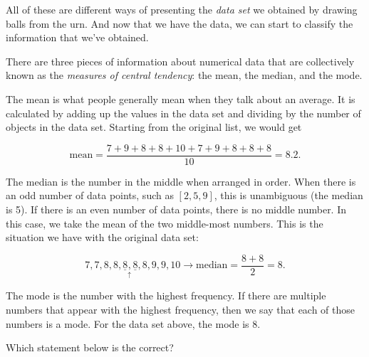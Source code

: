 \documentclass{ximera}
\begin{document}
\begin{image}
\end{image}

All of these are different ways of presenting the \emph{data set} we obtained by drawing balls from the urn. And now that we have the data, we can start to classify the information that we've obtained.

There are three pieces of information about numerical data that are collectively known as the \emph{measures of central tendency}: the mean, the median, and the mode.

The mean is what people generally mean when they talk about an average. It is calculated by adding up the values in the data set and dividing by the number of objects in the data set. Starting from the original list, we would get

\[ \text{mean} = \dfrac{7 + 9 + 8 + 8 + 10 + 7 + 9 + 8 + 8 + 8}{10} = 8.2. \]

The median is the number in the middle when arranged in order. When there is an odd number of data points, such as $[2, 5, 9]$, this is unambiguous (the median is 5). If there is an even number of data points, there is no middle number. In this case, we take the mean of the two middle-most numbers. This is the situation we have with the original data set:

\[ 7, 7, 8, 8, \underline{8} \underset{\uparrow}{,} \underline{8}, 8, 9, 9, 10 \rightarrow \text{median} = \dfrac{8 + 8}{2} = 8. \]

The mode is the number with the highest frequency. If there are multiple numbers that appear with the highest frequency, then we say that each of those numbers is a mode. For the data set above, the mode is 8.

\begin{question}
Which statement below is the correct?

    \begin{multipleChoice}
    \end{multipleChoice}

\end{question} 
\end{document}
